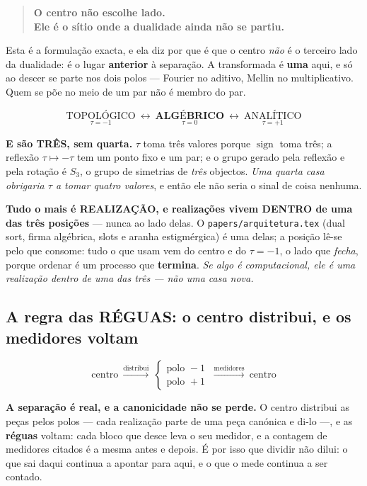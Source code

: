 \documentclass[11pt,a4paper]{article}
\newcommand{\code}[1]{\texttt{\small #1}}
\begin{document}
\begin{quote}
\textbf{O centro não escolhe lado.\\
Ele é o sítio onde a dualidade ainda não se partiu.}
\end{quote}

\noindent Esta é a formulação exacta, e ela diz por que é que o centro \emph{não} é o
terceiro lado da dualidade: é o lugar \textbf{anterior} à separação. A transformada é
\textbf{uma} aqui, e só ao descer se parte nos dois polos --- Fourier no aditivo, Mellin no
multiplicativo. Quem se põe no meio de um par não é membro do par.

\[
\boxed{\;\underset{\tau=-1}{\text{TOPOLÓGICO}}\ \longleftrightarrow\
\underset{\tau=0}{\textbf{ALGÉBRICO}}\ \longleftrightarrow\
\underset{\tau=+1}{\text{ANALÍTICO}}\;}
\]

\noindent\textbf{E são TRÊS, sem quarta.} $\tau$ toma três valores porque
$\operatorname{sign}$ toma três; a reflexão $\tau\mapsto-\tau$ tem um ponto fixo e um par; e
o grupo gerado pela reflexão e pela rotação é $S_3$, o grupo de simetrias de \emph{três}
objectos. \emph{Uma quarta casa obrigaria $\tau$ a tomar quatro valores}, e então ele não
seria o sinal de coisa nenhuma.

\textbf{Tudo o mais é REALIZAÇÃO, e realizações vivem DENTRO de uma das três posições} ---
nunca ao lado delas. O \code{papers/arquitetura.tex} (dual sort, firma algébrica,
slots e aranha estigmérgica) é uma delas; a posição
lê-se pelo que consome: tudo o que usam vem do centro e do $\tau=-1$, o lado que
\emph{fecha}, porque ordenar é um processo que \textbf{termina}. \emph{Se algo é
computacional, ele é uma realização dentro de uma das três --- não uma casa nova.}

\subsection*{A regra das RÉGUAS: o centro distribui, e os medidores voltam}

\[
\boxed{\;
\text{centro}
\ \overset{\text{distribui}}{\longrightarrow}\
\begin{cases}\text{polo }-1\\[2pt]\text{polo }+1\end{cases}
\ \overset{\text{medidores}}{\longrightarrow}\
\text{centro}\;}
\]

\noindent\textbf{A separação é real, e a canonicidade não se perde.} O centro distribui as
peças pelos polos --- cada realização parte de uma peça canónica e di-lo ---, e as
\textbf{réguas} voltam: cada bloco que desce leva o seu medidor, e a contagem de medidores
citados é a mesma antes e depois. É por isso que dividir não dilui: o que sai daqui
continua a apontar para aqui, e o que o mede continua a ser contado.
\end{document}

